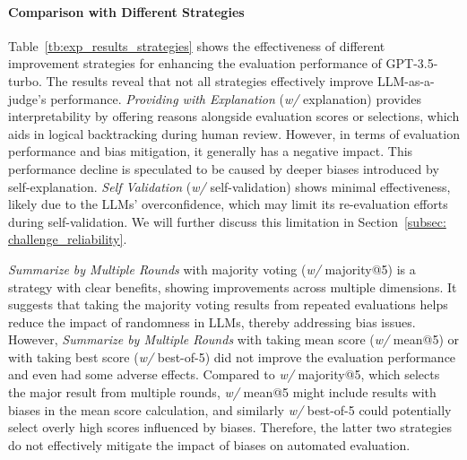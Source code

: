 \documentclass[acmsmall,screen]{acmart}
\begin{document}
\paragraph{\textbf{Comparison with Different Strategies}}
Table~\ref{tb:exp_results_strategies} shows the effectiveness of different improvement strategies for enhancing the evaluation performance of GPT-3.5-turbo. 
The results reveal that not all strategies effectively improve LLM-as-a-judge's performance. 
\textit{Providing with Explanation} (\textit{w/} explanation) provides interpretability by offering reasons alongside evaluation scores or selections, which aids in logical backtracking during human review. However, in terms of evaluation performance and bias mitigation, it generally has a negative impact. This performance decline is speculated to be caused by deeper biases introduced by self-explanation. \textit{Self Validation} (\textit{w/} self-validation) shows minimal effectiveness, likely due to the LLMs' overconfidence, which may limit its re-evaluation efforts during self-validation. We will further discuss this limitation in Section~\ref{subsec: challenge_reliability}.

\textit{Summarize by Multiple Rounds} with majority voting (\textit{w/} majority@5) is a strategy with clear benefits, showing improvements across multiple dimensions. It suggests that taking the majority voting results from repeated evaluations helps reduce the impact of randomness in LLMs, thereby addressing bias issues. However, \textit{Summarize by Multiple Rounds} with taking mean score (\textit{w/} mean@5) or with taking best score (\textit{w/} best-of-5) did not improve the evaluation performance and even had some adverse effects. Compared to \textit{w/} majority@5, which selects the major result from multiple rounds, \textit{w/} mean@5 might include results with biases in the mean score calculation, and similarly \textit{w/} best-of-5 could potentially select overly high scores influenced by biases. Therefore, the latter two strategies do not effectively mitigate the impact of biases on automated evaluation. 
\end{document}
